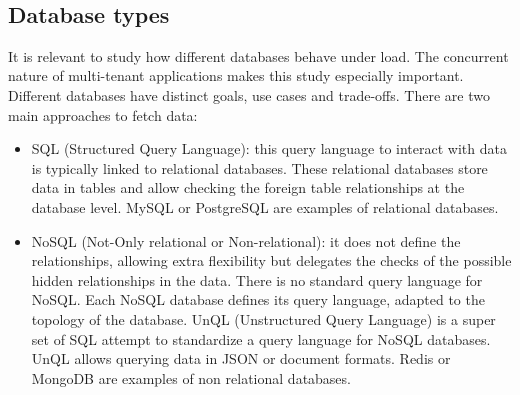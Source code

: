 \documentclass[12pt,english]{article} %
\begin{document}
\ 

\subsection{Database types}
It is relevant to study how different databases behave under load.
The concurrent nature of multi-tenant applications makes this study especially important.
Different databases have distinct goals, use cases and trade-offs.
There are two main approaches to fetch data:
\begin{itemize}
    \item SQL (Structured Query Language): this query language to interact with data is typically linked to relational databases.
    These relational databases store data in tables and allow checking the foreign table relationships at the database level.
    MySQL or PostgreSQL are examples of relational databases.
    \item NoSQL (Not-Only relational or Non-relational): it does not define the relationships, allowing extra flexibility but delegates the checks of the possible hidden relationships in the data.
    There is no standard query language for NoSQL.
    Each NoSQL database defines its query language, adapted to the topology of the database.
    UnQL (Unstructured Query Language) is a super set of SQL attempt to standardize a query language for NoSQL databases.
    UnQL allows querying data in JSON or document formats.
    Redis or MongoDB are examples of non relational databases.
\end{itemize}
\end{document}
